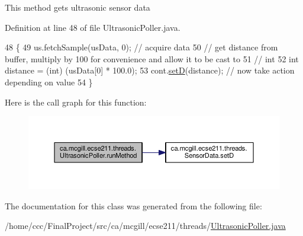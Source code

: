 This method gets ultrasonic sensor data 

Definition at line 48 of file Ultrasonic\+Poller.\+java.


\begin{DoxyCode}
48                              \{
49     us.fetchSample(usData, 0); \textcolor{comment}{// acquire data}
50     \textcolor{comment}{// get distance from buffer, multiply by 100 for convenience and allow it to be cast to}
51     \textcolor{comment}{// int}
52     \textcolor{keywordtype}{int} distance = (int) (usData[0] * 100.0);
53     cont.\hyperlink{classca_1_1mcgill_1_1ecse211_1_1threads_1_1_sensor_data_a2c1f8e625478b89aabe6e9911e482ef3}{setD}(distance); \textcolor{comment}{// now take action depending on value}
54   \}
\end{DoxyCode}
Here is the call graph for this function\+:\nopagebreak
\begin{figure}[H]
\begin{center}
\leavevmode
\includegraphics[width=350pt]{classca_1_1mcgill_1_1ecse211_1_1threads_1_1_ultrasonic_poller_a8e6a84342aedc1b72741dbc2e80148c4_cgraph}
\end{center}
\end{figure}


The documentation for this class was generated from the following file\+:\begin{DoxyCompactItemize}
\item 
/home/ccc/\+Final\+Project/src/ca/mcgill/ecse211/threads/\hyperlink{_ultrasonic_poller_8java}{Ultrasonic\+Poller.\+java}\end{DoxyCompactItemize}
